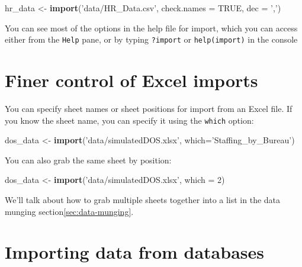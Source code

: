 \documentclass[12pt,letterpaperpaper,openany]{book}
\newenvironment{Shaded}{\begin{snugshade}}{\end{snugshade}}
\newcommand{\DataTypeTok}[1]{\textcolor[rgb]{0.13,0.29,0.53}{#1}}
\newcommand{\DecValTok}[1]{\textcolor[rgb]{0.00,0.00,0.81}{#1}}
\newcommand{\KeywordTok}[1]{\textcolor[rgb]{0.13,0.29,0.53}{\textbf{#1}}}
\newcommand{\NormalTok}[1]{#1}
\newcommand{\OtherTok}[1]{\textcolor[rgb]{0.56,0.35,0.01}{#1}}
\newcommand{\StringTok}[1]{\textcolor[rgb]{0.31,0.60,0.02}{#1}}
\begin{document}
\begin{Shaded}
\begin{Highlighting}[]
\NormalTok{hr_data <-}\StringTok{ }\KeywordTok{import}\NormalTok{(}\StringTok{'data/HR_Data.csv'}\NormalTok{, }\DataTypeTok{check.names =} \OtherTok{TRUE}\NormalTok{, }\DataTypeTok{dec =} \StringTok{','}\NormalTok{)}
\end{Highlighting}
\end{Shaded}

You can see most of the options in the help file for import, which you can access
either from the \texttt{Help} pane, or by typing \texttt{?import} or \texttt{help(import)} in the console

\hypertarget{finer-control-of-excel-imports}{%
\section{Finer control of Excel imports}\label{finer-control-of-excel-imports}}

You can specify sheet names or sheet positions for import from an Excel file. If you
know the sheet name, you can specify it using the \texttt{which} option:

\begin{Shaded}
\begin{Highlighting}[]
\NormalTok{dos_data <-}\StringTok{ }\KeywordTok{import}\NormalTok{(}\StringTok{'data/simulatedDOS.xlsx'}\NormalTok{, }\DataTypeTok{which=}\StringTok{'Staffing_by_Bureau'}\NormalTok{)}
\end{Highlighting}
\end{Shaded}

You can also grab the same sheet by position:

\begin{Shaded}
\begin{Highlighting}[]
\NormalTok{dos_data <-}\StringTok{ }\KeywordTok{import}\NormalTok{(}\StringTok{'data/simulatedDOS.xlsx'}\NormalTok{, }\DataTypeTok{which =} \DecValTok{2}\NormalTok{)}
\end{Highlighting}
\end{Shaded}

We'll talk about how to grab multiple sheets together into a list in the data munging section\ref{sec:data-munging}.

\hypertarget{importing-data-from-databases}{%
\section{Importing data from databases}\label{importing-data-from-databases}}
\end{document}
